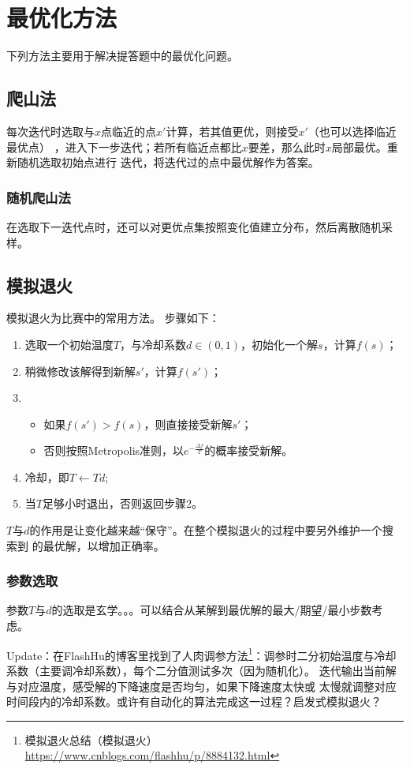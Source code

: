 \section{最优化方法}
下列方法主要用于解决提答题中的最优化问题。
\subsection{爬山法}
每次迭代时选取与$x$点临近的点$x'$计算，若其值更优，则接受$x'$（也可以选择临近最优点）
，进入下一步迭代；若所有临近点都比$x$要差，那么此时$x$局部最优。重新随机选取初始点进行
迭代，将迭代过的点中最优解作为答案。
\subsubsection{随机爬山法}
在选取下一迭代点时，还可以对更优点集按照变化值建立分布，然后离散随机采样。
\subsection{模拟退火}
模拟退火为比赛中的常用方法。
步骤如下：
\begin{enumerate}
	\item 选取一个初始温度$T$，与冷却系数$d\in (0,1)$，初始化一个解$s$，计算$f(s)$；
	\item 稍微修改该解得到新解$s'$，计算$f(s')$；
	\item \begin{itemize}
		      \item 如果$f(s')>f(s)$，则直接接受新解$s'$；
		      \item 否则按照Metropolis准则，以$e^{-\frac{\Delta f}{T}}$的概率接受新解。
	      \end{itemize}
	\item 冷却，即$T\leftarrow Td$;
	\item 当$T$足够小时退出，否则返回步骤2。
\end{enumerate}
$T$与$d$的作用是让变化越来越``保守''。在整个模拟退火的过程中要另外维护一个搜索到
的最优解，以增加正确率。

\subsubsection{参数选取}
参数$T$与$d$的选取是玄学。。。可以结合从某解到最优解的最大/期望/最小步数考虑。

Update：在FlashHu的博客里找到了人肉调参方法\footnote{
	模拟退火总结（模拟退火）\\
	\url{https://www.cnblogs.com/flashhu/p/8884132.html}
}：调参时二分初始温度与冷却系数（主要调冷却系数），每个二分值测试多次（因为随机化）。
迭代输出当前解与对应温度，感受解的下降速度是否均匀，如果下降速度太快或
太慢就调整对应时间段内的冷却系数。或许有自动化的算法完成这一过程？启发式模拟退火？

